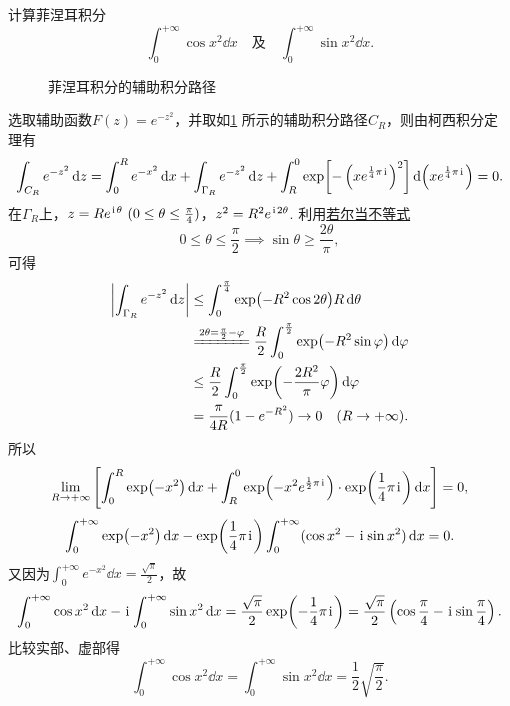 \begin{example}
计算菲涅耳积分\[
\int_0^{+\infty} \cos x^2 \dd{x}
\quad\text{及}\quad
\int_0^{+\infty} \sin x^2 \dd{x}.
\]
\begin{solution}
\begin{figure}[ht]
\centering
{}
\caption{菲涅耳积分的辅助积分路径}
\label{figure:留数定理.菲涅耳积分的辅助积分路径}
\end{figure}

选取辅助函数\(F(z) = e^{-z^2}\)，并取如\cref{figure:留数定理.菲涅耳积分的辅助积分路径} 所示的辅助积分路径\(C_R\)，则由柯西积分定理有\[
\int_{C_R} e^{-z^2} \dd{z}
= \int_0^R e^{-x^2} \dd{x}
+ \int_{\Gamma_R} e^{-z^2} \dd{z}
+ \int_R^0 \exp[-\left(x e^{\frac{1}{4}\pi\kern1pt\mathrm{i}\kern1pt}\right)^2] \dd(x e^{\frac{1}{4}\pi\kern1pt\mathrm{i}\kern1pt})
= 0.
\]
在\(\Gamma_R\)上，\(z = R e^{\iu\theta}\ (0\leq\theta\leq\frac{\pi}{4})\)，\(z^2 = R^2 e^{\kern1pt\mathrm{i}\kern1pt2\theta}\).
利用\hyperref[equation:微分中值定理.若尔当不等式]{若尔当不等式}\[
0\leq\theta\leq\frac{\pi}{2}
\implies
\sin\theta\geq\frac{2\theta}{\pi},
\]可得\begin{align*}
\abs{\int_{\Gamma_R} e^{-z^2} \dd{z}}
&\leq
\int_0^{\frac{\pi}{4}} \exp(-R^2 \cos2\theta) R\dd{\theta} \\
&\xlongequal{2\theta=\frac{\pi}{2}-\varphi}
\frac{R}{2} \int_0^{\frac{\pi}{2}} \exp(-R^2 \sin\varphi) \dd{\varphi} \\
&\leq
\frac{R}{2} \int_0^{\frac{\pi}{2}} \exp(-\frac{2R^2}{\pi}\varphi) \dd{\varphi} \\
&= \frac{\pi}{4R} (1-e^{-R^2})
\to0\quad(R\to+\infty).
\end{align*}
所以\[
\lim\limits_{R\to+\infty} \left[
\int_0^R \exp(-x^2) \dd{x}
+ \int_R^0 \exp(-x^2 e^{\frac{1}{2}\pi\kern1pt\mathrm{i}\kern1pt}) \cdot \exp(\frac{1}{4}\pi\kern1pt\mathrm{i}\kern1pt) \dd{x}
\right] = 0,
\]\[
\int_0^{+\infty} \exp(-x^2) \dd{x} - \exp(\frac{1}{4}\pi\kern1pt\mathrm{i}\kern1pt) \int_0^{+\infty} (\cos x^2 - \kern1pt\mathrm{i}\kern1pt \sin x^2) \dd{x} = 0.
\]又因为\(\int_0^{+\infty} e^{-x^2} \dd{x} = \frac{\sqrt{\pi}}{2}\)，故\[
\int_0^{+\infty} \cos x^2 \dd{x}
- \kern1pt\mathrm{i}\kern1pt \int_0^{+\infty} \sin x^2 \dd{x}
= \frac{\sqrt{\pi}}{2} \exp(-\frac{1}{4}\pi\kern1pt\mathrm{i}\kern1pt)
= \frac{\sqrt{\pi}}{2} \left(\cos\frac{\pi}{4} - \kern1pt\mathrm{i}\kern1pt \sin\frac{\pi}{4}\right).
\]比较实部、虚部得\begin{equation}\label{equation:留数定理.菲涅耳积分}
\int_0^{+\infty} \cos x^2 \dd{x}
= \int_0^{+\infty} \sin x^2 \dd{x}
= \frac{1}{2} \sqrt{\frac{\pi}{2}}.
\end{equation}
\end{solution}
\end{example}

